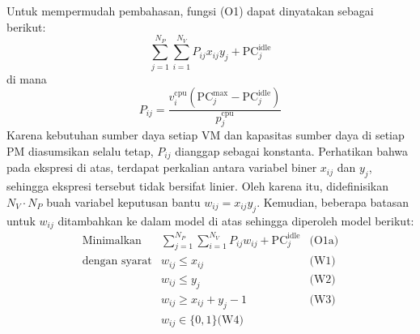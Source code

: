 Untuk mempermudah pembahasan, fungsi (O1) dapat dinyatakan sebagai berikut:
\begin{equation*}
\displaystyle \sum_{j=1}^{N_P}\sum_{i=1}^{N_V}P_{ij}x_{ij}y_j+\text{PC}_j^\text{idle}
\end{equation*}
di mana
\begin{equation*}
P_{ij}=\displaystyle\frac{v_i^\text{cpu}(\text{PC}_j^{\text{max}}-\text{PC}_j^\text{idle})}{p_j^\text{cpu}}
\end{equation*}
Karena kebutuhan sumber daya setiap VM dan kapasitas sumber daya di setiap PM diasumsikan selalu tetap, $P_{ij}$ dianggap sebagai konstanta.
Perhatikan bahwa pada ekspresi di atas, terdapat perkalian antara variabel biner $x_{ij}$ dan $y_j$, sehingga ekspresi tersebut tidak bersifat linier. Oleh karena itu, didefinisikan $N_V\cdot N_P$ buah variabel keputusan bantu $w_{ij}=x_{ij}y_j$. Kemudian, beberapa batasan untuk $w_{ij}$ ditambahkan ke dalam model di atas sehingga diperoleh model berikut:
\begin{equation*}
\begin{array}{rlll}
\text{Minimalkan} & \displaystyle \sum_{j=1}^{N_P}\sum_{i=1}^{N_V}P_{ij}w_{ij}+\text{PC}_j^\text{idle} & \text{(O1a)}\\
\text{dengan syarat} & w_{ij} \leq x_{ij} & \text{(W1)}\\
& w_{ij} \leq y_{j}& \text{(W2)}\\
& w_{ij} \geq x_{ij} + y_j - 1& \text{(W3)}\\
& w_{ij} \in \{0,1\} \text{(W4)}\\
\end{array}
\end{equation*}
